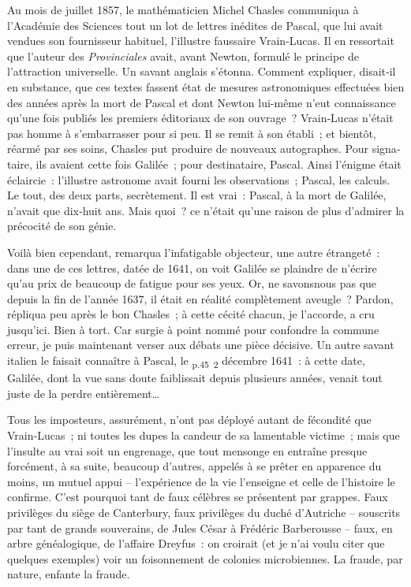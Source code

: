 \documentclass[french,twoside]{book} %
\begin{document}
\noindent Au mois de juillet 1857, le mathématicien Michel Chasles communiqua à l’Académie des Sciences tout un lot de lettres inédites de Pascal, que lui avait vendues son fournisseur habituel, l’illustre faussaire Vrain‑Lucas. Il en ressortait que l’auteur des \emph{Provinciales} avait, avant Newton, formulé le principe de l’attraction universelle. Un savant anglais s’étonna. Com­ment expliquer, disait‑il en substance, que ces textes fassent état de mesures astronomiques effectuées bien des années après la mort de Pascal et dont Newton lui-même n’eut connaissance qu’une fois publiés les premiers éditoriaux de son ouvrage ? Vrain‑Lucas n’était pas homme à s’embarrasser pour si peu. Il se remit à son établi ; et bientôt, réarmé par ses soins, Chasles put produire de nouveaux autographes. Pour signa­taire, ils avaient cette fois Galilée ; pour destinataire, Pascal. Ainsi l’énigme était éclaircie : l’illustre astronome avait fourni les observations ; Pascal, les calculs. Le tout, des deux parts, secrètement. Il est vrai : Pascal, à la mort de Galilée, n’avait que dix‑huit ans. Mais quoi ? ce n’était qu’une raison de plus d’admirer la précocité de son génie.\par
Voilà bien cependant, remarqua l’infatigable objecteur, une autre étrangeté : dans une de ces lettres, datée de 1641, on voit Galilée se plaindre de n’écrire qu’au prix de beaucoup de fatigue pour ses yeux. Or, ne savons­nous pas que depuis la fin de l’année 1637, il était en réalité complètement aveugle ? Pardon, répliqua peu après le bon Chasles ; à cette cécité chacun, je l’accorde, a cru jusqu’ici. Bien à tort. Car surgie à point nommé pour confondre la commune erreur, je puis maintenant verser aux débats une pièce décisive. Un autre savant italien le faisait connaître à Pascal, le \textsubscript{p.45 2} décembre 1641 : à cette date, Galilée, dont la vue sans doute faiblissait depuis plusieurs années, venait tout juste de la perdre entièrement…\par
Tous les imposteurs, assurément, n’ont pas déployé autant de fécondité que Vrain‑Lucas ; ni toutes les dupes la candeur de sa lamentable victime ; mais que l’insulte au vrai soit un engrenage, que tout mensonge en entraîne presque forcément, à sa suite, beaucoup d’autres, appelés à se prêter en apparence du moins, un mutuel appui – l’expérience de la vie l’enseigne et celle de l’histoire le confirme. C’est pourquoi tant de faux célèbres se présentent par grappes. Faux privilèges du siège de Canterbury, faux privilèges du duché d’Autriche – souscrits par tant de grands souverains, de Jules César à Frédéric Barberousse – faux, en arbre généalogique, de l’affaire Dreyfus : on croirait (et je n’ai voulu citer que quelques exem­ples) voir un foisonnement de colonies microbiennes. La fraude, par nature, enfante la fraude.\par
\end{document}
